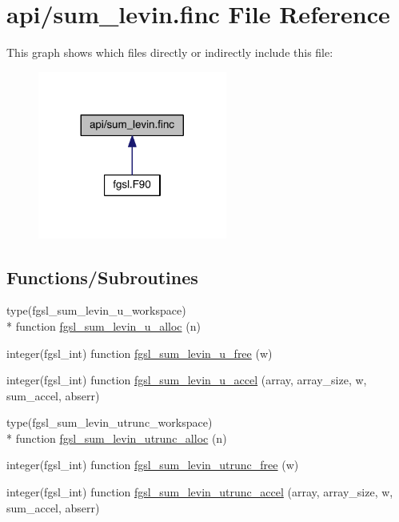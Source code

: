 \hypertarget{sum__levin_8finc}{\section{api/sum\-\_\-levin.finc File Reference}
\label{sum__levin_8finc}
}
This graph shows which files directly or indirectly include this file\-:
\nopagebreak
\begin{figure}[H]
\begin{center}
\leavevmode
\includegraphics[width=176pt]{sum__levin_8finc__dep__incl}
\end{center}
\end{figure}
\subsection*{Functions/\-Subroutines}
\begin{DoxyCompactItemize}
\item 
type(fgsl\-\_\-sum\-\_\-levin\-\_\-u\-\_\-workspace) \\*
function \hyperlink{sum__levin_8finc_ad6ebf8afa62ed4d6df0ccc045becc409}{fgsl\-\_\-sum\-\_\-levin\-\_\-u\-\_\-alloc} (n)
\item 
integer(fgsl\-\_\-int) function \hyperlink{sum__levin_8finc_aaf7b37dc4577512c18cb3973ad84252e}{fgsl\-\_\-sum\-\_\-levin\-\_\-u\-\_\-free} (w)
\item 
integer(fgsl\-\_\-int) function \hyperlink{sum__levin_8finc_ae945413c5c10344d97cc10002dd760c2}{fgsl\-\_\-sum\-\_\-levin\-\_\-u\-\_\-accel} (array, array\-\_\-size, w, sum\-\_\-accel, abserr)
\item 
type(fgsl\-\_\-sum\-\_\-levin\-\_\-utrunc\-\_\-workspace) \\*
function \hyperlink{sum__levin_8finc_a877def7077d13d9c9f6940266bc44a54}{fgsl\-\_\-sum\-\_\-levin\-\_\-utrunc\-\_\-alloc} (n)
\item 
integer(fgsl\-\_\-int) function \hyperlink{sum__levin_8finc_a4703b473d5be9896645002d25bff9467}{fgsl\-\_\-sum\-\_\-levin\-\_\-utrunc\-\_\-free} (w)
\item 
integer(fgsl\-\_\-int) function \hyperlink{sum__levin_8finc_aafbf5e22d1e3d84b254f5b0800c4c3bf}{fgsl\-\_\-sum\-\_\-levin\-\_\-utrunc\-\_\-accel} (array, array\-\_\-size, w, sum\-\_\-accel, abserr)
\end{DoxyCompactItemize}


